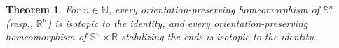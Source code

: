 \documentclass[microtype]{gtpart}
\newcommand{\br}{\mathbb{R}}
\newcommand{\bn}{\mathbb N}
\newcommand{\ssm}{\smallsetminus}
\newtheorem{Thm}{Theorem}[section]
\theoremstyle{definition}
\numberwithin{equation}{section}
\begin{document}
\begin{Thm}
For \( n \in \bn \), every orientation-preserving homeomorphism of \( \mathbb S^n \) (resp., \( \br^n \)) is isotopic to the identity, and every orientation-preserving homeomorphism of \( \mathbb S^n \times \br \) stabilizing the ends is isotopic to the identity. 
\end{Thm}
\end{document}

